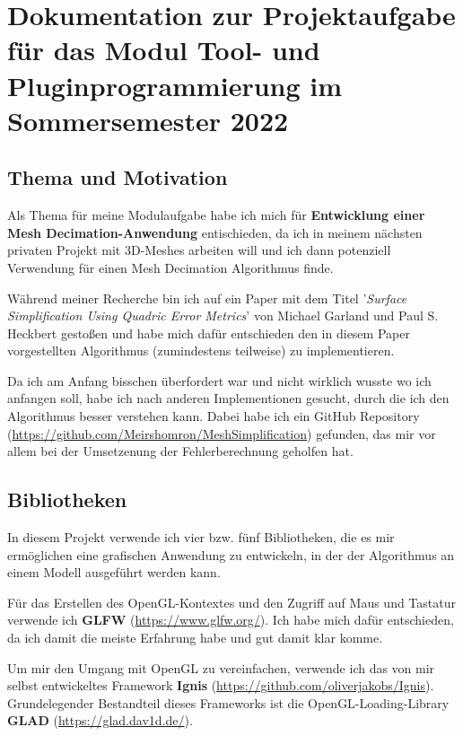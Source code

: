\documentclass[a4paper,12pt]{book}
\begin{document}
\chapter*{Dokumentation zur Projektaufgabe für das Modul Tool- und Pluginprogrammierung im Sommersemester 2022}

\section*{Thema und Motivation}

Als Thema für meine Modulaufgabe habe ich mich für \textbf{Entwicklung einer Mesh Decimation-Anwendung} entischieden, da ich in meinem nächsten privaten Projekt mit 3D-Meshes arbeiten will und ich dann potenziell Verwendung für einen Mesh Decimation Algorithmus finde. 

Während meiner Recherche bin ich auf ein Paper mit dem Titel '\emph{Surface Simplification Using Quadric Error Metrics}' von Michael Garland und Paul S. Heckbert gestoßen und habe mich dafür entschieden den in diesem Paper vorgestellten Algorithmus (zumindestens teilweise) zu implementieren.

Da ich am Anfang bisschen überfordert war und nicht wirklich wusste wo ich anfangen soll, habe ich nach anderen Implementionen gesucht, durch die ich den Algorithmus besser verstehen kann. Dabei habe ich ein GitHub Repository (\url{https://github.com/Meirshomron/MeshSimplification}) gefunden, das mir vor allem bei der Umsetzenung der Fehlerberechnung geholfen hat.

\section*{Bibliotheken}

In diesem Projekt verwende ich vier bzw. fünf Bibliotheken, die es mir ermöglichen eine grafischen Anwendung zu entwickeln, in der der Algorithmus an einem Modell ausgeführt werden kann. 

Für das Erstellen des OpenGL-Kontextes und den Zugriff auf Maus und Tastatur verwende ich \textbf{GLFW} (\url{https://www.glfw.org/}). Ich habe mich dafür entschieden, da ich damit die meiste Erfahrung habe und gut damit klar komme.

Um mir den Umgang mit OpenGL zu vereinfachen, verwende ich das von mir selbst entwickeltes Framework \textbf{Ignis} (\url{https://github.com/oliverjakobs/Ignis}). 
Grundelegender Bestandteil dieses Frameworks ist die OpenGL-Loading-Library \textbf{GLAD} (\url{https://glad.dav1d.de/}).
\end{document}
